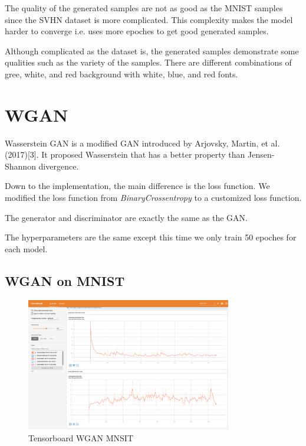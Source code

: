 \documentclass{article}
\begin{document}
The quality of the generated samples are not as good as the MNIST samples since the SVHN dataset is more complicated.
This complexity makes the model harder to converge i.e. uses more epoches to get good generated samples.

Although complicated as the dataset is, the generated samples demonstrate some qualities such as the variety of the samples. There are different combinations of gree, white, and red background with white, blue, and red fonts.

\section{WGAN}

Wasserstein GAN is a modified GAN introduced by Arjovsky, Martin, et al.(2017)[3]. 
It proposed Wasserstein that has a better property than Jensen-Shannon divergence.

Down to the implementation, the main difference is the loss function. We modified the loss function from \textit{BinaryCrossentropy} to a customized loss function.

The generator and discriminator are exactly the same as the GAN.

The hyperparameters are the same except this time we only train 50 epoches for each model.

\subsection{WGAN on MNIST}

\begin{figure}[!htb]
  \centering
  \includegraphics[width=0.8\textwidth]{tensorboard-WGAN-MNIST.png}
  \caption{Tensorboard WGAN MNSIT}
  \label{fig:TB_GAN_MNSIT}
\end{figure}
\end{document}
